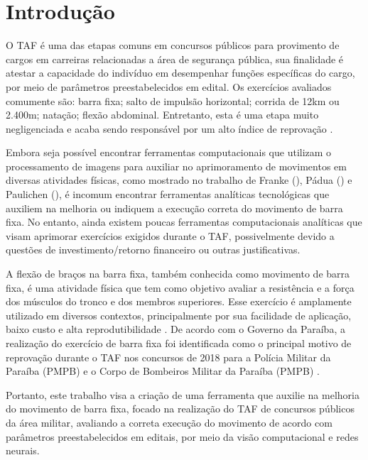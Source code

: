 \chapter{Introdução}



O \ac{TAF} é uma das etapas comuns em concursos públicos para provimento de cargos em carreiras relacionadas a área de segurança pública, sua finalidade é atestar a capacidade do indivíduo em desempenhar funções específicas do cargo, por meio de parâmetros preestabelecidos em edital. Os exercícios avaliados comumente são: barra fixa; salto de impulsão horizontal; corrida de 12km ou 2.400m; natação; flexão abdominal. Entretanto, esta é uma etapa muito negligenciada e acaba sendo responsável por um alto índice de reprovação \cite{reprovaTAF}.


Embora seja possível encontrar ferramentas computacionais que utilizam o processamento de imagens para auxiliar no aprimoramento de movimentos em diversas atividades físicas, como mostrado no trabalho de Franke (\citeyear{vcBicicleta}), Pádua (\citeyear{vcFutebol}) e Paulichen (\citeyear{futebolTatica}), é incomum encontrar ferramentas analíticas tecnológicas que auxiliem na melhoria ou indiquem a execução correta do movimento de barra fixa. No entanto, ainda existem poucas ferramentas computacionais analíticas que visam aprimorar exercícios exigidos durante o \ac{TAF}, possivelmente devido a questões de investimento/retorno financeiro ou outras justificativas.


A flexão de braços na barra fixa, também conhecida como movimento de barra fixa, é uma atividade física que tem como objetivo avaliar a resistência e a força dos músculos do tronco e dos membros superiores. Esse exercício é amplamente utilizado em diversos contextos, principalmente por sua facilidade de aplicação, baixo custo e alta reprodutibilidade \cite{barraFixa}. De acordo com o Governo da Paraíba, a realização do exercício de barra fixa foi identificada como o principal motivo de reprovação durante o \ac{TAF} nos concursos de 2018 para a Polícia Militar da Paraíba (PMPB) e o Corpo de Bombeiros Militar da Paraíba (PMPB) \cite{barraTAF}.


Portanto, este trabalho visa a criação de uma ferramenta que auxilie na melhoria do movimento de barra fixa, focado na realização do \ac{TAF} de concursos públicos da área militar, avaliando a correta execução do movimento de acordo com parâmetros preestabelecidos em editais, por meio da visão computacional e redes neurais.



